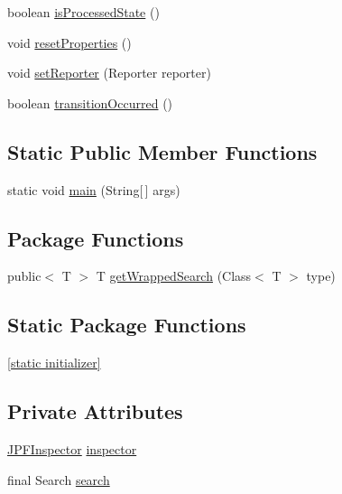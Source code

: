 \begin{DoxyCompactItemize}
boolean \hyperlink{classgov_1_1nasa_1_1jpf_1_1inspector_1_1server_1_1jpf_1_1_search_wrapper_a03cdc7fa0ea0f60be046de8ba7aadb7f}{is\+Processed\+State} ()
\item 
void \hyperlink{classgov_1_1nasa_1_1jpf_1_1inspector_1_1server_1_1jpf_1_1_search_wrapper_a7348798155569cacf71d2c788c3c3a0f}{reset\+Properties} ()
\item 
void \hyperlink{classgov_1_1nasa_1_1jpf_1_1inspector_1_1server_1_1jpf_1_1_search_wrapper_a956b6738c532a7f89301a2f3ca2f89e7}{set\+Reporter} (Reporter reporter)
\item 
boolean \hyperlink{classgov_1_1nasa_1_1jpf_1_1inspector_1_1server_1_1jpf_1_1_search_wrapper_a90a783afe52dd88cc7ffa9c3782cf30d}{transition\+Occurred} ()
\end{DoxyCompactItemize}
\subsection*{Static Public Member Functions}
\begin{DoxyCompactItemize}
\item 
static void \hyperlink{classgov_1_1nasa_1_1jpf_1_1inspector_1_1server_1_1jpf_1_1_search_wrapper_a6e01c0991fafb298378f7ff581c1a579}{main} (String\mbox{[}$\,$\mbox{]} args)
\end{DoxyCompactItemize}
\subsection*{Package Functions}
\begin{DoxyCompactItemize}
\item 
public$<$ T $>$ T \hyperlink{classgov_1_1nasa_1_1jpf_1_1inspector_1_1server_1_1jpf_1_1_search_wrapper_ad0bf507c1c3e9478a91051c12179e3d3}{get\+Wrapped\+Search} (Class$<$ T $>$ type)
\end{DoxyCompactItemize}
\subsection*{Static Package Functions}
\begin{DoxyCompactItemize}
\item 
\hyperlink{classgov_1_1nasa_1_1jpf_1_1inspector_1_1server_1_1jpf_1_1_search_wrapper_ad129daae19f5caadda16ae016412c7a9}{\mbox{[}static initializer\mbox{]}}
\end{DoxyCompactItemize}
\subsection*{Private Attributes}
\begin{DoxyCompactItemize}
\item 
\hyperlink{classgov_1_1nasa_1_1jpf_1_1inspector_1_1server_1_1jpf_1_1_j_p_f_inspector}{J\+P\+F\+Inspector} \hyperlink{classgov_1_1nasa_1_1jpf_1_1inspector_1_1server_1_1jpf_1_1_search_wrapper_ab36c021b698a215395d5ea85b8036b3c}{inspector}
\item 
final Search \hyperlink{classgov_1_1nasa_1_1jpf_1_1inspector_1_1server_1_1jpf_1_1_search_wrapper_a5a0209e7de55d2271fd8a8caacc963e8}{search}
\end{DoxyCompactItemize}


